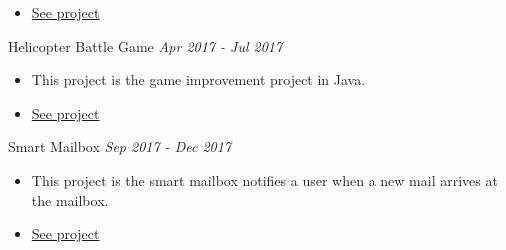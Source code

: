 \documentclass[10pt]{article}
\newenvironment{changemargin}[2]{
  \begin{list}{}{
    \setlength{\topsep}{0pt}
    \setlength{\leftmargin}{#1}
    \setlength{\rightmargin}{#2}
    \setlength{\listparindent}{\parindent}
    \setlength{\itemindent}{\parindent}
    \setlength{\parsep}{\parskip}
  }
  \item[]}{\end{list}
}
\newcommand{\project}[2]{
	{#1} \hfill \emph{#2}\\ \medskip
}
\newenvironment{body} {
	\vspace*{-16pt}
	\begin{changemargin}{-0.25in}{-0.5in}
  }
	{\end{changemargin}
}
\begin{document}
\begin{body}
\begin{itemize}
      \item \href{https://github.com/jeongwhanchoi/MLND-Capstone-Project}{See project}
  	\end{itemize}
\project{Helicopter Battle Game}{Apr 2017 - Jul 2017}
\begin{itemize} \itemsep -0pt  %
      \item  This project is the game improvement project in Java.
      \item \href{https://github.com/jeongwhanchoi/helicopter_battle}{See project}
  	\end{itemize}
\project{Smart Mailbox}{Sep 2017 - Dec 2017}
\begin{itemize} \itemsep -0pt  %
      \item  This project is the smart mailbox notifies a user when a new mail arrives at the mailbox.
      \item \href{https://github.com/jeongwhanchoi/Smart-Mailbox}{See project}
  	\end{itemize}	
\end{body}


\medskip
\end{document}

